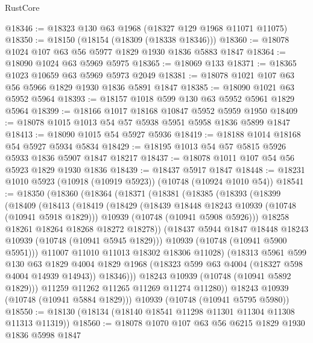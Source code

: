 \begin{lexlean}{RustCore}
\begin{coremodule}
@18346 := @18323 @130 @63 @1968 (@18327 @129 @1968 @11071 @11075)
@18350 := @18150 (@18154 (@18309 (@18338 @18346)))
@18360 := @18078 @1024 @107 @63 @56 @5977 @1829 @1930 @1836 @5883 @1847
@18364 := @18090 @1024 @63 @5969 @5975
@18365 := @18069 @133
@18371 := @18365 @1023 @10659 @63 @5969 @5973 @2049
@18381 := @18078 @1021 @107 @63 @56 @5966 @1829 @1930 @1836 @5891 @1847
@18385 := @18090 @1021 @63 @5952 @5964
@18393 := @18157 @1018 @599 @130 @63 @5952 @5961 @1829 @5964
@18399 := @18166 @1017 @18168 @10847 @5952 @5959 @1950
@18409 := @18078 @1015 @1013 @54 @57 @5938 @5951 @5958 @1836 @5899 @1847
@18413 := @18090 @1015 @54 @5927 @5936
@18419 := @18188 @1014 @18168 @54 @5927 @5934 @5834
@18429 := @18195 @1013 @54 @57 @5815 @5926 @5933 @1836 @5907 @1847 @18217
@18437 := @18078 @1011 @107 @54 @56 @5923 @1829 @1930 @1836
@18439 := @18437 @5917 @1847
@18448 := @18231 @1010 @5923 (@10918 (@10919 @5923)) (@10748 (@10924 @1010 @54))
@18541 := @18350
    (@18360
      (@18364
        (@18371
          (@18381
            (@18385
              (@18393
                (@18399
                  (@18409
                    (@18413
                      (@18419
                        (@18429
                          (@18439 @18448 @18243 @10939 (@10748 (@10941 @5918 @1829)))
                          @10939
                          (@10748 (@10941 @5908 @5926)))
                        @18258
                        @18261
                        @18264
                        @18268
                        @18272
                        @18278))
                    (@18437 @5944 @1847 @18448 @18243 @10939 (@10748 (@10941 @5945 @1829)))
                    @10939
                    (@10748 (@10941 @5900 @5951)))
                  @11007
                  @11010
                  @11013
                  @18302
                  @18306
                  @11028)
                (@18313
                  @5961
                  @599
                  @130
                  @63
                  @1829
                  @4004
                  @1829
                  @1968
                  (@18323 @599 @63 @4004 (@18327 @598 @4004 @14939 @14943))
                  @18346)))
            @18243
            @10939
            (@10748 (@10941 @5892 @1829)))
          @11259
          @11262
          @11265
          @11269
          @11274
          @11280))
      @18243
      @10939
      (@10748 (@10941 @5884 @1829)))
    @10939
    (@10748 (@10941 @5795 @5980))
@18550 := @18130 (@18134 (@18140 @18541 @11298 @11301 @11304 @11308 @11313 @11319))
@18560 := @18078 @1070 @107 @63 @56 @6215 @1829 @1930 @1836 @5998 @1847

\end{coremodule}
\end{lexlean}
